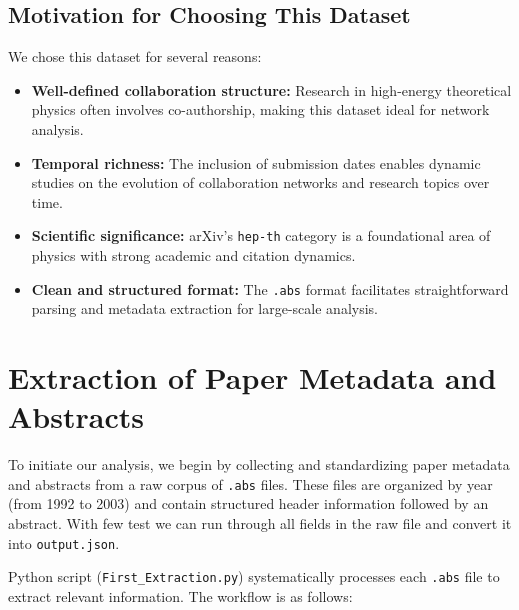 \documentclass[12pt]{article}
\begin{document}
\subsection{Motivation for Choosing This Dataset}

We chose this dataset for several reasons:
\begin{itemize}
    \item \textbf{Well-defined collaboration structure:} Research in high-energy theoretical physics often involves co-authorship, making this dataset ideal for network analysis.
    \item \textbf{Temporal richness:} The inclusion of submission dates enables dynamic studies on the evolution of collaboration networks and research topics over time.
    \item \textbf{Scientific significance:} arXiv’s \texttt{hep-th} category is a foundational area of physics with strong academic and citation dynamics.
    \item \textbf{Clean and structured format:} The \texttt{.abs} format facilitates straightforward parsing and metadata extraction for large-scale analysis.
\end{itemize}


\section{Extraction of Paper Metadata and Abstracts}

To initiate our analysis, we begin by collecting and standardizing paper metadata and abstracts from a raw corpus of \texttt{.abs} files. These files are organized by year (from 1992 to 2003) and contain structured header information followed by an abstract. With few test we can run through all fields in the raw file and convert it into \texttt{output.json}.

Python script (\texttt{First\_Extraction.py}) systematically processes each \texttt{.abs} file to extract relevant information. The workflow is as follows:
\end{document}
